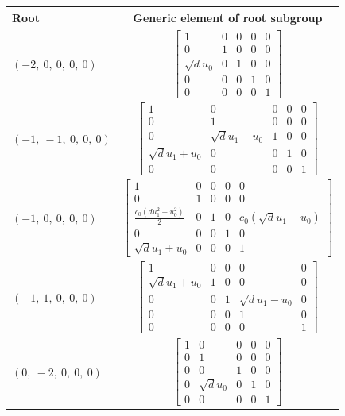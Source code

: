\documentclass[11pt]{article}
\theoremstyle{definition}
\begin{document}
\noindent \begin{longtable}{|l|c|}
    \hline
    \textbf{Root} & \textbf{Generic element of root subgroup} \\
    \hline
    \endhead
    $\left( -2, \  0, \  0, \  0, \  0\right)$ & ${\left[\begin{matrix}1 & 0 & 0 & 0 & 0\\0 & 1 & 0 & 0 & 0\\\sqrt{d} u_{0} & 0 & 1 & 0 & 0\\0 & 0 & 0 & 1 & 0\\0 & 0 & 0 & 0 & 1\end{matrix}\right]}$ \\
    \hline
    $\left( -1, \  -1, \  0, \  0, \  0\right)$ & ${\left[\begin{matrix}1 & 0 & 0 & 0 & 0\\0 & 1 & 0 & 0 & 0\\0 & \sqrt{d} u_{1} - u_{0} & 1 & 0 & 0\\\sqrt{d} u_{1} + u_{0} & 0 & 0 & 1 & 0\\0 & 0 & 0 & 0 & 1\end{matrix}\right]}$ \\
    \hline
    $\left( -1, \  0, \  0, \  0, \  0\right)$ & ${\left[\begin{matrix}1 & 0 & 0 & 0 & 0\\0 & 1 & 0 & 0 & 0\\\frac{c_{0} \left(d u_{1}^{2} - u_{0}^{2}\right)}{2} & 0 & 1 & 0 & c_{0} \left(\sqrt{d} u_{1} - u_{0}\right)\\0 & 0 & 0 & 1 & 0\\\sqrt{d} u_{1} + u_{0} & 0 & 0 & 0 & 1\end{matrix}\right]}$ \\
    \hline
    $\left( -1, \  1, \  0, \  0, \  0\right)$ & ${\left[\begin{matrix}1 & 0 & 0 & 0 & 0\\\sqrt{d} u_{1} + u_{0} & 1 & 0 & 0 & 0\\0 & 0 & 1 & \sqrt{d} u_{1} - u_{0} & 0\\0 & 0 & 0 & 1 & 0\\0 & 0 & 0 & 0 & 1\end{matrix}\right]}$ \\
    \hline
    $\left( 0, \  -2, \  0, \  0, \  0\right)$ & ${\left[\begin{matrix}1 & 0 & 0 & 0 & 0\\0 & 1 & 0 & 0 & 0\\0 & 0 & 1 & 0 & 0\\0 & \sqrt{d} u_{0} & 0 & 1 & 0\\0 & 0 & 0 & 0 & 1\end{matrix}\right]}$ \\

\end{longtable}
\end{document}
